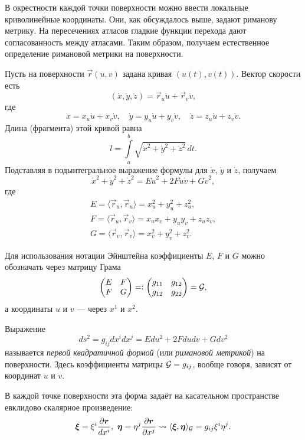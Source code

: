 В окрестности каждой точки поверхности можно ввести локальные криволинейные координаты. Они, как обсуждалось выше, задают риманову метрику. На пересечениях атласов гладкие функции перехода дают согласованность между атласами. Таким образом, получаем естественное определение римановой метрики на поверхности.

Пусть на поверхности $\vec{r}(u, v)$ задана кривая $(u(t), v(t))$. Вектор скорости есть
\[
	(\dot{x}, \dot{y}, \dot{z}) = \vec{r}_u\dot{u} + \vec{r}_v\dot{v},
\]
где
\[
	\dot{x} = x_u\dot{u} + x_v\dot{v},\quad
	\dot{y} = y_u\dot{u} + y_v\dot{v},\quad
	\dot{z} = z_u\dot{u} + z_v\dot{v}.
\]
Длина (фрагмента) этой кривой равна
\[
	l = \int\limits_a^b\sqrt{\dot{x}^2 + \dot{y}^2 + \dot{z}^2}\,dt.
\]
Подставляя в подынтегральное выражение формулы для $\dot{x}$, $\dot{y}$ и $\dot{z}$, получаем
\[
	\dot{x}^2 + \dot{y}^2 + \dot{z}^2 = E\dot{u}^2 + 2F\dot{u}\dot{v} + G\dot{v}^2,
\]
где
\begin{gather*}
	E = \langle\vec{r}_u, \vec{r}_u\rangle = x_u^2 + y_u^2 + z_u^2,\\
	F = \langle\vec{r}_u, \vec{r}_v\rangle = x_ux_v + y_uy_v + z_uz_v,\\
	G = \langle\vec{r}_v, \vec{r}_v\rangle = x_v^2 + y_v^2 + z_v^2.
\end{gather*}

Для использования нотации Эйнштейна коэффициенты $E$, $F$ и $G$ можно обозначать через матрицу Грама
\[
	\begin{pmatrix}
		E & F\\
		F & G
	\end{pmatrix} = \vcentcolon
	\begin{pmatrix}
		g_{11} & g_{12}\\
		g_{12} & g_{22}
	\end{pmatrix} = \mathcal{G},
\]
а координаты $u$ и $v$ --- через $x^1$ и $x^2$.

\begin{definition}
	Выражение
	\[
		ds^2 = g_{ij}dx^idx^j = Edu^2 + 2Fdudv + Gdv^2
	\]
	называется \textit{первой квадратичной формой} (или \textit{римановой метрикой}) на поверхности. Здесь коэффициенты матрицы $\mathcal{G} = g_{ij}$, вообще говоря, зависят от координат $u$ и $v$.
\end{definition}

В каждой точке поверхности эта форма задаёт на касательном пространстве евклидово скалярное произведение:
\[
	\vec{\xi} = \xi^i\frac{\partial \vec{r}}{dx^i},\ \vec{\eta} = \eta^j\frac{\partial \vec{r}}{\partial x^j} \leadsto \langle\vec{\xi}, \vec{\eta}\rangle_\G = g_{ij}\xi^i\eta^j.
\]

